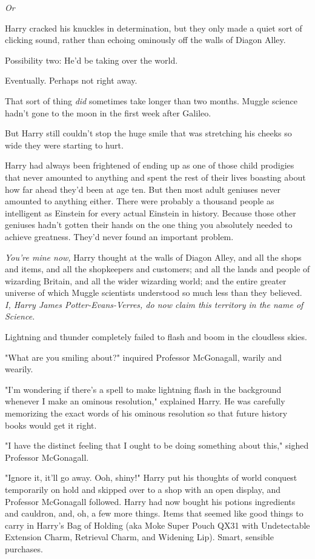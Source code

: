 \emph{Or}{\el}

Harry cracked his knuckles in determination, but they only made a quiet sort of
clicking sound, rather than echoing ominously off the walls of Diagon Alley.

Possibility two: He'd be taking over the world.

Eventually. Perhaps not right away.

That sort of thing \emph{did} sometimes take longer than two months. Muggle
science hadn't gone to the moon in the first week after Galileo.

But Harry still couldn't stop the huge smile that was stretching his cheeks so
wide they were starting to hurt.

Harry had always been frightened of ending up as one of those child prodigies
that never amounted to anything and spent the rest of their lives boasting
about how far ahead they'd been at age ten. But then most adult geniuses never
amounted to anything either. There were probably a thousand people as
intelligent as Einstein for every actual Einstein in history. Because those
other geniuses hadn't gotten their hands on the one thing you absolutely needed
to achieve greatness. They'd never found an important problem.

\emph{You're mine now,} Harry thought at the walls of Diagon Alley, and all the
shops and items, and all the shopkeepers and customers; and all the lands and
people of wizarding Britain, and all the wider wizarding world; and the entire
greater universe of which Muggle scientists understood so much less than they
believed. \emph{I, Harry James Potter-Evans-Verres, do now claim this territory
in the name of Science.}

Lightning and thunder completely failed to flash and boom in the cloudless
skies.

"What are you smiling about?" inquired Professor McGonagall, warily and wearily.

"I'm wondering if there's a spell to make lightning flash in the background
whenever I make an ominous resolution," explained Harry. He was carefully
memorizing the exact words of his ominous resolution so that future history
books would get it right.

"I have the distinct feeling that I ought to be doing something about this,"
sighed Professor McGonagall.

"Ignore it, it'll go away. Ooh, shiny!" Harry put his thoughts of world
conquest temporarily on hold and skipped over to a shop with an open display,
and Professor McGonagall followed.
\sbreak
Harry had now bought his potions ingredients and cauldron, and, oh, a few more
things. Items that seemed like good things to carry in Harry's Bag of Holding
(aka Moke Super Pouch QX31 with Undetectable Extension Charm, Retrieval Charm,
and Widening Lip). Smart, sensible purchases.

